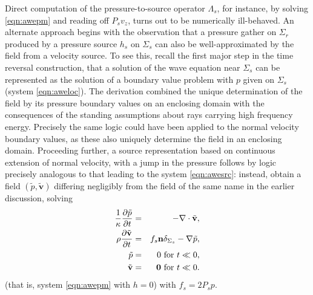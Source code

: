 \documentclass[12pt]{geophysics}
\newcommand{\bv}{\mathbf{v}}
\begin{document}
Direct computation of the pressure-to-source operator $\Lambda_s$, for instance, by solving
\ref{eqn:awepm} and reading off $P_sv_{z}$, turns out to be
numerically ill-behaved. An alternate approach begins with the
observation that a pressure gather on $\Sigma_r$ produced by a
pressure source $h_s$ on $\Sigma_s$ can also be well-approximated by
the field from a velocity source. To see this, recall the first major
step in the time reversal construction, that a solution of the wave
equation near $\Sigma_s$ can be represented as the solution of a
boundary value problem with $p$ given on $\Sigma_s$ (system
\ref{eqn:aweloc}). The derivation combined the unique determination of
the field by its pressure boundary values on an enclosing domain with
the consequences of the standing assumptions about rays carrying high
frequency energy. Precisely the same logic could have been applied to
the normal velocity boundary values, as these also uniquely determine
the field in an enclosing domain. Proceeding further, a source
representation based on continuous extension of normal velocity, with
a jump in the pressure follows by logic precisely analogous to that
leading to the system \ref{eqn:awesrc}: instead, obtain a field
$(\tilde{p},\tilde{\bv})$ differing negligibly from the field of the
same name in the earlier discussion, solving 
\begin{eqnarray}
\label{eqn:awesrcvzmod}
  \frac{1}{\kappa}\frac{\partial\tilde{p}}{\partial t} & = & 
                                                      - \nabla \cdot \tilde{\bv}, \nonumber \\
  \rho\frac{\partial \tilde{\bv}}{\partial t} & = & f_s {\bf n}\delta_{\Sigma_s}- \nabla \tilde{p}, \nonumber \\
  \tilde{p} & = & 0 \mbox{ for }  t \ll 0, \nonumber \\
  \tilde{\bv} & = & {\bf 0} \mbox{ for }  t \ll  0.       
\end{eqnarray}
(that is, system \ref{eqn:awepm} with $h=0$) with $f_s = 2P_sp$.
\end{document}
